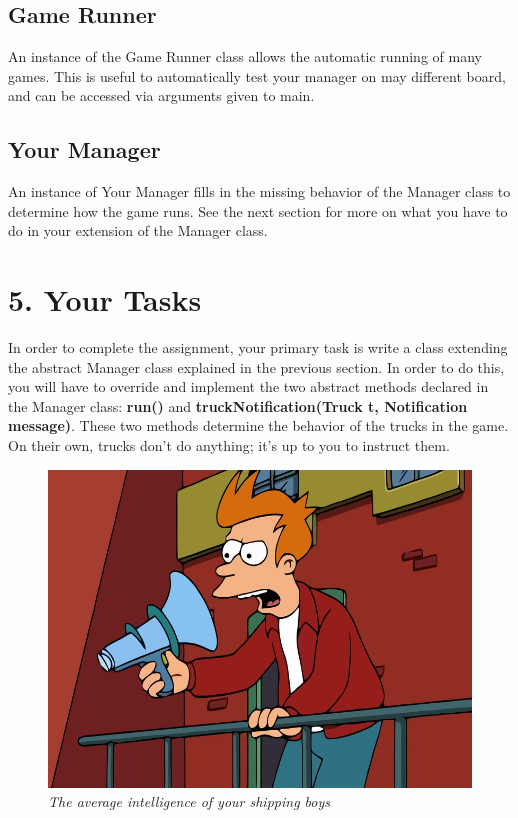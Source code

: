 \documentclass[11pt]{article}
\begin{document}
\subsection{Game Runner}
An instance of the Game Runner class allows the automatic running of many games. This is useful to automatically test your manager on may different board, and can be accessed via arguments given to main.
\subsection{Your Manager}
An instance of Your Manager fills in the missing behavior of the Manager class to determine how the game runs. See the next section for more on what you have to do in your extension of the Manager class.

\newpage
\section{5. Your Tasks}
In order to complete the assignment, your primary task is write a class extending the abstract Manager class explained in the previous section. In order to do this, you will have to override and implement the two abstract methods declared in the Manager class: \textbf{run()} and \textbf{truckNotification(Truck t, Notification message)}. These two methods determine the behavior of the trucks in the game. On their own, trucks don't do anything; it's up to you to instruct them.\\

\begin{figure}[h]
\centerline{\includegraphics[scale=0.4]{fry.jpg}} 
\caption{\em{The average intelligence of your shipping boys}}
\end{figure}
\end{document}
